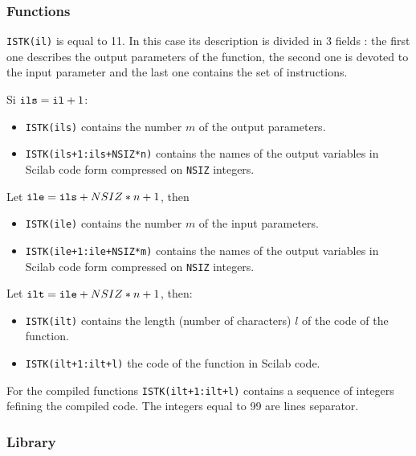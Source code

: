\subsubsection{Functions}
{\tt ISTK(il)} is equal to 11. In this case its description is divided in
3 fields : the first one describes the output parameters of the function,
the second one is devoted to the input parameter and the last one contains
the set of instructions.

Si ${\tt ils}={\tt il}+1$:

\begin{itemize}

\item{\tt ISTK(ils)} contains the number $m$ of the output parameters.

\item{\tt ISTK(ils+1:ils+NSIZ*n)}   contains the names of the output variables
in Scilab code form compressed on {\tt NSIZ} integers.

\end{itemize}

Let ${\tt ile}={\tt ils}+NSIZ*n+1$, then

\begin{itemize}

\item{\tt ISTK(ile)} contains the number $m$ of the input parameters.

\item {\tt ISTK(ile+1:ile+NSIZ*m)}   contains the names of the output 
variables in Scilab code form compressed on {\tt NSIZ} integers.

\end{itemize}

Let ${\tt ilt}={\tt ile}+NSIZ*n+1$, then:

\begin{itemize}

\item{\tt   ISTK(ilt)}  contains the length (number of characters) $l$
of the code of the function.

\item{\tt ISTK(ilt+1:ilt+l)} the code of the function in Scilab code.

\end{itemize}

For the compiled functions \verb!ISTK(ilt+1:ilt+l)!   contains
a sequence of integers fefining the compiled code. The integers equal to
99 are lines separator.

\subsubsection{Library}

